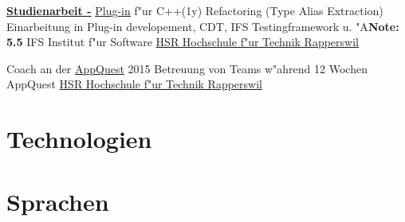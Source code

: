 \documentclass[11pt,legalpaper,sans]{moderncv}
\begin{document}
{\href{https://eprints.hsr.ch/479/1/aliextor.pdf}{\textbf{Studienarbeit -}} \href{https://www.youtube.com/watch?v=QNrb_LbuYmI}{Plug-in} f"ur C++(1y) Refactoring (Type Alias Extraction)}{}
{\newline{}Einarbeitung in Plug-in developement, CDT, IFS Testingframework u. "A}{\hfill \textbf{Note: 5.5}}
{IFS Institut f"ur Software \hfill\href{http://www.hsr.ch/}{HSR Hochschule f"ur Technik Rapperswil}}

{Coach an der \href{http://appquest.hsr.ch/}{AppQuest} 2015}{}
{\newline{}Betreuung von Teams w"ahrend 12 Wochen}{}
{AppQuest \hfill\href{http://www.hsr.ch/}{HSR Hochschule f"ur Technik Rapperswil}}

\section{Technologien}
{}{}{}{}

\section{Sprachen}
{}{}{}{}
{}{}{}{}
\end{document}
